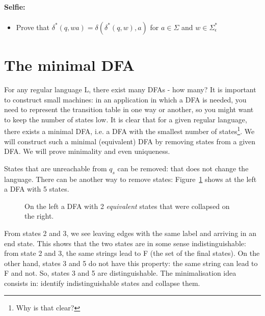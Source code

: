 \paragraph{Selfie:}
\begin{itemize}
\item[]
Prove that $\delta^*(q,wa) = \delta(\delta^*(q,w),a)$ for $a \in
\Sigma$ and $w \in \Sigma_{\epsilon}^*$
\end{itemize}

\clearpage
\section{The minimal DFA}\label{minfsa}

For any regular language L, there exist many DFAs - how many? It is
important to construct small machines: in an application in which a
DFA is needed, you need to represent the transition table in one way
or another, so you might want to keep the number of states low. It is
clear that for a given regular language, there exists a minimal DFA,
i.e. a DFA with the smallest number of states\footnote{Why is that
clear?}. We will construct such a minimal (equivalent) DFA by removing
states from a given DFA. We will prove minimality and even uniqueness.

States that are unreachable from $q_s$ can be removed: that does not
change the language. There can be another way to remove states:
Figure~\ref{mini1} shows at the left a DFA with 5 states.

\begin{figure}[h]
\caption{ On the left a DFA with 2 {\em equivalent} states that were
collapsed on the right.\label{mini1}}
\end{figure}

From states 2 and 3, we see leaving edges with the same label and
arriving in an end state. This shows that the two states are in some
sense indistinguishable: from state 2 and 3, the same strings lead to
F (the set of the final states). On the other hand, states 3 and 5 do not have this property: the
same string can lead to F and not. So, states 3 and 5 are
distinguishable. The minimalisation idea consists in: identify
indistinguishable states and collapse them.

